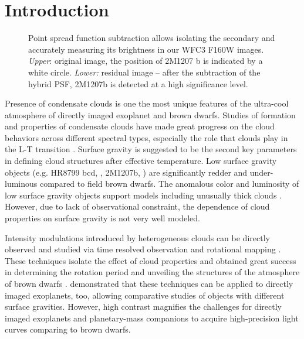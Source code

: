 \documentclass[apj]{emulateapj}
\begin{document}
\section{Introduction}

\begin{figure}
\centering
  \caption{Point spread function subtraction allows isolating the
    secondary and accurately measuring its brightness in our WFC3
    F160W images. {\em Upper}: original image, the position of 2M1207
    b is indicated by a white circle.  {\em Lower:} residual image --
    after the subtraction of the hybrid PSF, 2M1207b is detected at a
    high significance level.}
  \label{fig:1}
\end{figure}

Presence of condensate clouds is one the most unique features of the
ultra-cool atmosphere of directly imaged exoplanet and brown
dwarfs. Studies of formation and properties of condensate clouds
\citep[e.g.][]{Ackerman2001, Burrows2006a, Helling2008, Allard2012}
have made great progress on the cloud behaviors across different
spectral types, especially the role that clouds play in the L-T
transition \citep[e.g.][]{Burrows2006a, Marley2010}.  Surface gravity
is suggested to be the second key parameters in defining cloud
structures \citep[e.g.][]{Marley2012} after effective temperature. Low
surface gravity objects (e.g. HR8799 bcd, \cite{Marois2008a}, 2M1207b, \cite{Chauvin2004}) are significantly redder and under-luminous
compared to field brown dwarfs.  The anomalous color and luminosity of
low surface gravity objects support models including unusually thick
clouds \citep{Currie2011, Madhusudhan2011,Skemer2011,
  Skemer2012}. However, due to lack of observational constraint, the
dependence of cloud properties on surface gravity is not very well
modeled.

Intensity modulations introduced by heterogeneous clouds can be
directly observed and studied via time resolved observation and
rotational mapping \citep[e.g.][]{Apai2013,Buenzli2012,Buenzli2015,Radigan2012,Yang2015,Metchev2015,Heinze2015}. These techniques isolate the effect of cloud
properties and obtained great success in determining the rotation
period and unveiling the structures of the atmosphere of brown dwarfs
. \citet{Kostov2013}
demonstrated that these techniques can be applied to directly imaged
exoplanets, too, allowing comparative studies of objects with
different surface gravities. However, high contrast magnifies the
challenges for directly imaged exoplanets and planetary-mass
companions to acquire high-precision light curves comparing to brown
dwarfs.
\end{document}
